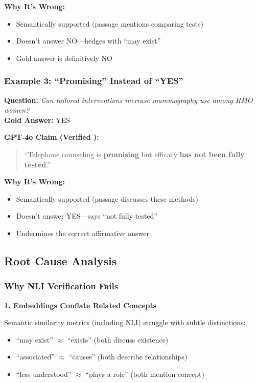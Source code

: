 \documentclass[11pt]{article}
\begin{document}
\textbf{Why It's Wrong:}
\begin{itemize}
\item[\checkmark] Semantically supported (passage mentions comparing tests)
\item[\texttimes] Doesn't answer NO—hedges with ``may exist''
\item[\texttimes] Gold answer is definitively NO
\end{itemize}

\subsubsection{Example 3: ``Promising'' Instead of ``YES''}

\textbf{Question:} \textit{Can tailored interventions increase mammography use among HMO women?}\\
\textbf{Gold Answer:} YES

\textbf{GPT-4o Claim (Verified \checkmark):}
\begin{quote}
``Telephone counseling is \textbf{promising} but efficacy \textbf{has not been fully tested}.''
\end{quote}

\textbf{Why It's Wrong:}
\begin{itemize}
\item[\checkmark] Semantically supported (passage discusses these methods)
\item[\texttimes] Doesn't answer YES—says ``not fully tested''
\item[\texttimes] Undermines the correct affirmative answer
\end{itemize}

\subsection{Root Cause Analysis}

\subsubsection{Why NLI Verification Fails}

\textbf{1. Embeddings Conflate Related Concepts}

Semantic similarity metrics (including NLI) struggle with subtle distinctions:
\begin{itemize}
\item ``may exist'' $\approx$ ``exists'' (both discuss existence)
\item ``associated'' $\approx$ ``causes'' (both describe relationships)
\item ``less understood'' $\approx$ ``plays a role'' (both mention concept)
\end{itemize}
\end{document}
